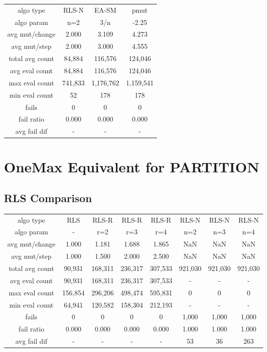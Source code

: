 \begin{tabular}[h]{cccc}
algo type&            RLS-N&     EA-SM&      pmut\\
algo param&             n=2&       3/n&     -2.25\\
avg mut/change&       2.000&     3.109&     4.273\\
avg mut/step&         2.000&     3.000&     4.555\\
\hline
total avg count&     84,884&   116,576&   124,046\\
avg eval count&      84,884&   116,576&   124,046\\
max eval count&     741,833& 1,176,762& 1,159,541\\
min eval count&          52&       178&       178\\
\hline
fails&                    0&         0&         0\\
fail ratio&           0.000&     0.000&     0.000\\
avg fail dif&             -&         -&         -\\
\end{tabular}


\section{OneMax Equivalent for PARTITION}

\subsection{RLS Comparison}


\begin{tabular}[h]{cccccccc}
algo type&            RLS&   RLS-R&   RLS-R&   RLS-R&   RLS-N&   RLS-N&   RLS-N\\
algo param&             -&     r=2&     r=3&     r=4&     n=2&     n=3&     n=4\\
avg mut/change&     1.000&   1.181&   1.688&   1.865&     NaN&     NaN&     NaN\\
avg mut/step&       1.000&   1.500&   2.000&   2.500&     NaN&     NaN&     NaN\\
\hline
total avg count&   90,931& 168,311& 236,317& 307,533& 921,030& 921,030& 921,030\\
avg eval count&    90,931& 168,311& 236,317& 307,533&       -&       -&       -\\
max eval count&   156,854& 296,206& 498,474& 595,831&       0&       0&       0\\
min eval count&    64,941& 120,582& 158,304& 212,193&       -&       -&       -\\
\hline
fails&                  0&       0&       0&       0&   1,000&   1,000&   1,000\\
fail ratio&         0.000&   0.000&   0.000&   0.000&   1.000&   1.000&   1.000\\
avg fail dif&           -&       -&       -&       -&      53&      36&     263\\
\end{tabular}

